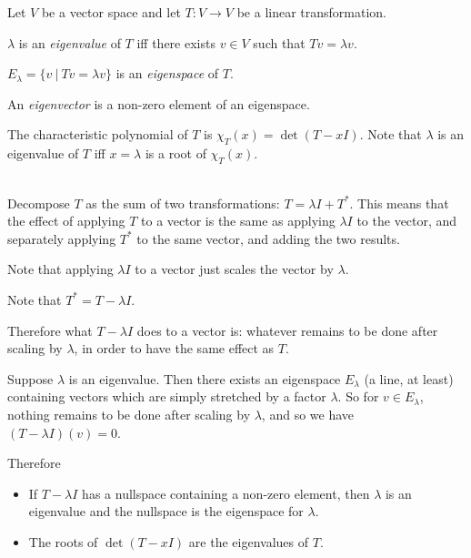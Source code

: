 Let $V$ be a vector space and let $T:V \to V$ be a linear transformation.

\begin{definition*}[eigenvalue]
  $\lambda$ is an \textit{eigenvalue} of $T$ iff there exists  $v \in V$ such that
  $Tv = \lambda v$.
\end{definition*}

\begin{definition*}[eigenspace]
  $E_\lambda = \{v ~|~ Tv = \lambda v\}$ is an \textit{eigenspace} of $T$.
\end{definition*}

\begin{definition*}[eigenvector]
  An \textit{eigenvector} is a non-zero element of an eigenspace.
\end{definition*}

\begin{definition*}
  The characteristic polynomial of $T$ is $\chi_T(x) = \det(T - xI)$. Note that
  $\lambda$ is an eigenvalue of $T$ iff $x=\lambda$ is a root of $\chi_T(x)$.
\end{definition*}

\begin{intuition*}~\\
  Decompose $T$ as the sum of two transformations: $T = \lambda I + T^*$. This
  means that the effect of applying $T$ to a vector is the same as applying
  $\lambda I$ to the vector, and separately applying $T^*$ to the same vector,
  and adding the two results.

  Note that applying $\lambda I$ to a vector just scales the vector by $\lambda$.

  Note that $T^* = T - \lambda I$.

  Therefore what $T - \lambda I$ does to a vector is: whatever remains to be done after
  scaling by $\lambda$, in order to have the same effect as $T$.

  Suppose $\lambda$ is an eigenvalue. Then there exists an eigenspace
  $E_\lambda$ (a line, at least) containing vectors which are simply stretched
  by a factor $\lambda$. So for $v \in E_\lambda$, nothing remains to be done
  after scaling by $\lambda$, and so we have $(T - \lambda I)(v) = 0$.

  Therefore
  \begin{itemize}
  \item If $T - \lambda I$ has a nullspace containing a non-zero element, then
    $\lambda$ is an eigenvalue and the nullspace is the eigenspace for
    $\lambda$.
  \item The roots of $\det(T - xI)$ are the eigenvalues of $T$.
  \end{itemize}

\end{intuition*}

